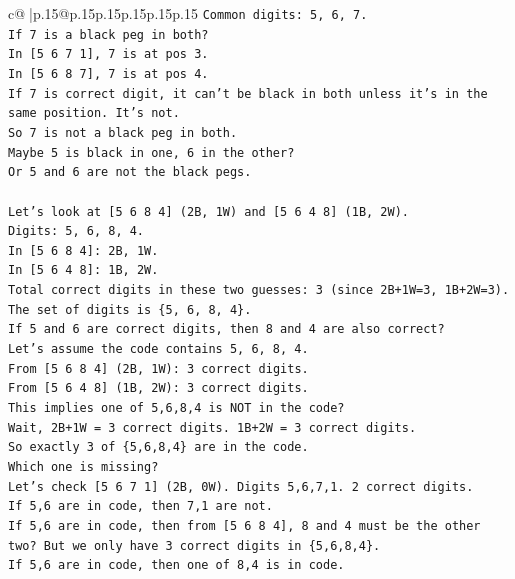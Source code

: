 \documentclass{article}
\begin{document}
{\begin{supertabular}{c@{$\;$}|p{.15\linewidth}@{}p{.15\linewidth}p{.15\linewidth}p{.15\linewidth}p{.15\linewidth}p{.15\linewidth}}
{{{\texttt{Common digits: 5, 6, 7.} \\
\texttt{If 7 is a black peg in both?} \\
\texttt{In {[}5 6 7 1{]}, 7 is at pos 3.} \\
\texttt{In {[}5 6 8 7{]}, 7 is at pos 4.} \\
\texttt{If 7 is correct digit, it can't be black in both unless it's in the same position. It's not.} \\
\texttt{So 7 is not a black peg in both.} \\
\texttt{Maybe 5 is black in one, 6 in the other?} \\
\texttt{Or 5 and 6 are not the black pegs.} \\
\\ 
\texttt{Let's look at {[}5 6 8 4{]} (2B, 1W) and {[}5 6 4 8{]} (1B, 2W).} \\
\texttt{Digits: 5, 6, 8, 4.} \\
\texttt{In {[}5 6 8 4{]}: 2B, 1W.} \\
\texttt{In {[}5 6 4 8{]}: 1B, 2W.} \\
\texttt{Total correct digits in these two guesses: 3 (since 2B+1W=3, 1B+2W=3).} \\
\texttt{The set of digits is \{5, 6, 8, 4\}.} \\
\texttt{If 5 and 6 are correct digits, then 8 and 4 are also correct?} \\
\texttt{Let's assume the code contains 5, 6, 8, 4.} \\
\texttt{From {[}5 6 8 4{]} (2B, 1W): 3 correct digits.} \\
\texttt{From {[}5 6 4 8{]} (1B, 2W): 3 correct digits.} \\
\texttt{This implies one of 5,6,8,4 is NOT in the code?} \\
\texttt{Wait, 2B+1W = 3 correct digits. 1B+2W = 3 correct digits.} \\
\texttt{So exactly 3 of \{5,6,8,4\} are in the code.} \\
\texttt{Which one is missing?} \\
\texttt{Let's check {[}5 6 7 1{]} (2B, 0W). Digits 5,6,7,1. 2 correct digits.} \\
\texttt{If 5,6 are in code, then 7,1 are not.} \\
\texttt{If 5,6 are in code, then from {[}5 6 8 4{]}, 8 and 4 must be the other two? But we only have 3 correct digits in \{5,6,8,4\}.} \\
\texttt{If 5,6 are in code, then one of 8,4 is in code.} \\
}}}
\end{supertabular}}
\end{document}
